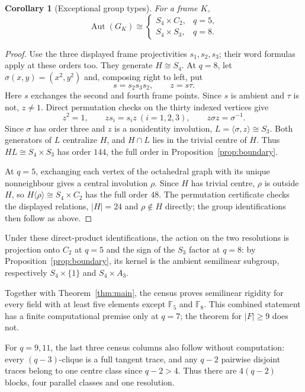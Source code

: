 \documentclass[11pt]{article}
\newtheorem{corollary}[theorem]{Corollary}
\theoremstyle{definition}
\theoremstyle{remark}
\newcommand{\F}{\mathbb F}
\newcommand{\Aut}{\operatorname{Aut}}
\begin{document}
\begin{corollary}[Exceptional group types]\label{cor:exceptional-groups}
For a frame $K$,
\[
 \Aut(G_K)\cong
 \begin{cases}
 S_4\times C_2,&q=5,\\
 S_4\times S_3,&q=8.
 \end{cases}
\]
\end{corollary}
\begin{proof}
Use the three displayed frame projectivities $s_1,s_2,s_3$; their word
formulas apply at these orders too. They generate $H\cong S_4$.
At $q=8$, let $\sigma(x,y)=(x^2,y^2)$ and, composing right to left, put
\[
 s=s_2s_3s_2,\qquad z=s\tau.
\]
Here $s$ exchanges the second and fourth frame points. Since $s$ is
ambient and $\tau$ is not, $z\ne1$. Direct permutation
checks on the thirty indexed vertices give
\[
 z^2=1,\qquad zs_i=s_i z\ (i=1,2,3),\qquad
 z\sigma z=\sigma^{-1}.
\]
Since $\sigma$ has order three and $z$ is a nonidentity involution,
$L=\langle\sigma,z\rangle\cong S_3$. Both generators of $L$ centralize
$H$, and $H\cap L$ lies in the trivial centre of $H$. Thus
$HL\cong S_4\times S_3$ has order $144$, the full order in
Proposition~\ref{prop:boundary}.

At $q=5$, exchanging each vertex of the octahedral graph with its unique
nonneighbour gives a central involution $\rho$. Since $H$ has trivial
centre, $\rho$ is outside $H$,
so $H\langle\rho\rangle\cong S_4\times C_2$ has the full order $48$.
The permutation certificate checks the displayed relations, $|H|=24$
and $\rho\notin H$ directly; the group identifications then follow as above.
\end{proof}

Under these direct-product identifications, the action on the two
resolutions is projection onto $C_2$ at $q=5$ and the sign of the $S_3$
factor at $q=8$: by Proposition~\ref{prop:boundary}, its kernel is the
ambient semilinear subgroup, respectively $S_4\times\{1\}$ and
$S_4\times A_3$.

Together with Theorem~\ref{thm:main}, the census proves semilinear rigidity
for every field with at least five elements except $\F_5$ and $\F_8$.
This combined statement has a finite computational premise only at
$q=7$; the theorem for $|F|\ge9$ does not.

For $q=9,11$, the last three census columns also follow without
computation: every $(q-3)$-clique is a full tangent trace, and any
$q-2$ pairwise disjoint traces belong to one centre class since $q-2>4$.
Thus there are $4(q-2)$ blocks, four parallel classes and one resolution.
\end{document}
